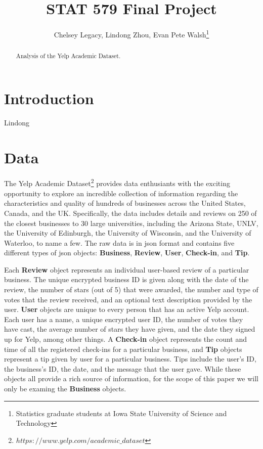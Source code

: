 \documentclass[11pt]{article}
\begin{document}
\author{Chelsey Legacy, Lindong Zhou, Evan Pete Walsh\footnote{Statistics graduate students at Iowa State University of Science and Technology}}
\title{STAT 579 Final Project}
\maketitle

\begin{abstract}
Analysis of the Yelp Academic Dataset.
\end{abstract}

\newpage

\tableofcontents

\newpage

\pagestyle{fancy}
\rhead{\thepage}
\rfoot{\today}
\cfoot{}%


\section{Introduction}

Lindong


\section{Data}

The Yelp Academic Dataset\footnote{$https://www.yelp.com/academic\_dataset$} provides data enthusiants with the exciting opportunity to explore an incredible collection of information regarding the characteristics and quality of hundreds of businesses across the United States, Canada, and the UK. Specifically, the data includes details and reviews on 250 of the closest businesses to 30 large universities, including the Arizona State, UNLV, the University of Edinburgh, the University of Wisconsin, and the University of Waterloo, to name a few. The raw data is in json format and contains five different types of json objects: \textbf{Business}, \textbf{Review}, \textbf{User}, \textbf{Check-in}, and \textbf{Tip}.

Each \textbf{Review} object represents an individual user-based review of a particular business. The unique encrypted business ID is given along with the date of the review, the number of stars (out of 5) that were awarded, the number and type of votes that the review received, and an optional text description provided by the user. \textbf{User} objects are unique to every person that has an active Yelp account. Each user has a name, a unique encrypted user ID, the number of votes they have cast, the average number of stars they have given, and the date they signed up for Yelp, among other things. A \textbf{Check-in} object represents the count and time of all the registered check-ins for a particular business, and \textbf{Tip} objects represent a tip given by user for a particular business. Tips include the user's ID, the business's ID, the date, and the message that the user gave. While these objects all provide a rich source of information, for the scope of this paper we will only be examing the \textbf{Business} objects.
\end{document}
